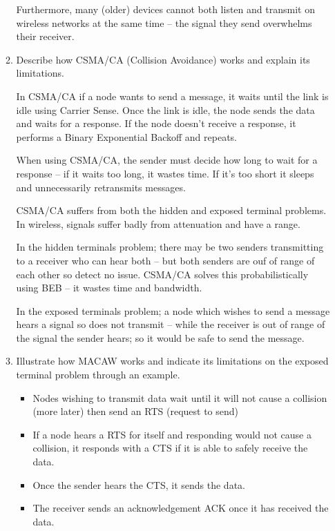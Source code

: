 \documentclass[10pt,\jkfside,a4paper]{article}
\begin{document}
\begin{enumerate}[label=(\alph*)]
\begin{enumerate}[label=(\roman*)]
Furthermore, many (older) devices cannot both listen and transmit on
wireless networks at the same time -- the signal they send
overwhelms their receiver.

\item Describe how CSMA/CA (Collision Avoidance) works and explain its
limitations.

In CSMA/CA if a node wants to send a message, it waits until the link is
idle using Carrier Sense. Once the link is idle, the node sends the data
and waits for a response. If the node doesn't receive a response, it
performs a Binary Exponential Backoff and repeats.

When using CSMA/CA, the sender must decide how long to wait for a response --
if it waits too long, it wastes time. If it's too short it sleeps and
unnecessarily retransmits messages.

CSMA/CA suffers from both the hidden and exposed terminal problems.
In wireless, signals suffer badly from attenuation and have a range.

In the hidden terminals problem; there may be two senders transmitting to
a receiver who can hear both -- but both senders are ouf of range of each
other so detect no issue. CSMA/CA solves this probabilistically using BEB
-- it wastes time and bandwidth.

In the exposed terminals problem; a node which wishes to send a message
hears a signal so does not transmit -- while the receiver is out of range
of the signal the sender hears; so it would be safe to send the message.

\item Illustrate how MACAW works and indicate its limitations on the
exposed terminal problem through an example.

\begin{itemize}

\item Nodes wishing to transmit data wait until it will not cause a
collision (more later) then send an RTS (request to send)

\item If a node hears a RTS for itself and responding would not cause a
collision, it responds with a CTS if it is able to safely receive the data.

\item Once the sender hears the CTS, it sends the data.

\item The receiver sends an acknowledgement ACK once it has received the data.


\end{itemize}
\end{enumerate}
\end{enumerate}
\end{document}
